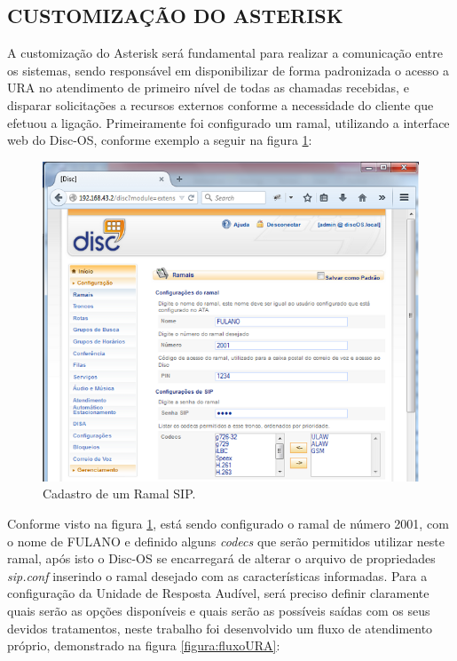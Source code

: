 \subsection{\textbf{\uppercase{Customização do Asterisk}}}

A customização do Asterisk será fundamental para realizar a comunicação entre os sistemas, sendo responsável em disponibilizar de forma padronizada o acesso a URA no atendimento de primeiro nível de todas as chamadas recebidas, e disparar solicitações a recursos externos conforme a necessidade do cliente que efetuou a ligação.
Primeiramente foi configurado um ramal, utilizando a interface web do Disc-OS, conforme exemplo a seguir na figura \ref{figura:cadastroRamapSIP}:


\begin{figure}[H]
	\centering
	\caption{Cadastro de um Ramal SIP.}	
	\label{figura:cadastroRamapSIP}
	\includegraphics{figuras/cadastro_ramal_sip.png}
\end{figure}


Conforme visto na figura \ref{figura:cadastroRamapSIP}, está sendo configurado o ramal de número 2001, com o nome de FULANO e definido alguns \textit{codecs} que serão permitidos utilizar neste ramal, após isto o Disc-OS se encarregará de alterar o arquivo de propriedades \textit{sip.conf} inserindo o ramal desejado com as características informadas.
Para a configuração da Unidade de Resposta Audível, será preciso definir claramente quais serão as opções disponíveis e quais serão as possíveis saídas com os seus devidos tratamentos, neste trabalho foi desenvolvido um fluxo de atendimento próprio, demonstrado na figura \ref{figura:fluxoURA}: 

